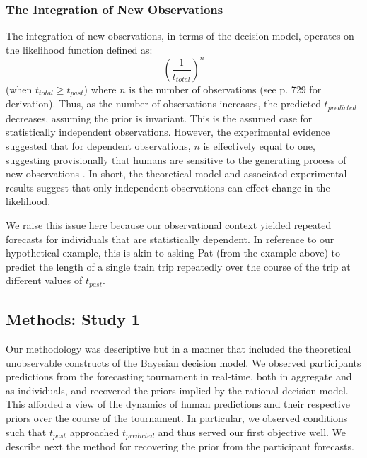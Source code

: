 \subsubsection{The Integration of New Observations}
The integration of new observations, in terms of the decision model, operates on the likelihood function defined as:
\begin{equation}\label{eq:likelihoodN}
   \left(\frac{1}{t_{total}} \right)^n
\end{equation}
(when $t_{total} \ge t_{past}$) where $n$ is the number of observations (see \cite{GriffithsTenenbaum2011} p. 729 for derivation).  Thus, as the number of observations increases, the predicted $t_{predicted}$ decreases, assuming the prior is invariant.  This is the assumed case for statistically independent observations.  However, the experimental evidence suggested that for dependent observations, $n$ is effectively equal to one, suggesting provisionally that humans are sensitive to the generating process of new observations \citep{GriffithsTenenbaum2011}.  In short, the theoretical model and associated experimental results suggest that only independent observations can effect change in the likelihood. 

We raise this issue here because our observational context yielded repeated forecasts for individuals that are statistically dependent.  In reference to our hypothetical example, this is akin to asking Pat (from the example above) to predict the length of a single train trip repeatedly over the course of the trip at different values of $t_{past}$.  



\subsection{Methods: Study 1}
Our methodology was descriptive but in a manner that included the theoretical unobservable constructs of the Bayesian decision model.  We observed participants predictions from the forecasting tournament in real-time, both in aggregate and as individuals, and recovered the priors implied by the rational decision model.  This afforded a view of the dynamics of human predictions and their respective priors over the course of the tournament.  In particular, we observed conditions such that $t_{past}$ approached $t_{predicted}$ and thus served our first objective well.  We describe next the method for recovering the prior from the participant forecasts. 

